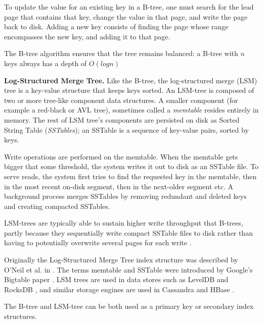 To update the value for an existing key in a B-tree, one must search for the lead page that contains that key,
change the value in that page, and write the page back to disk.
Adding a new key consists of finding the page whose range encompasses the new key, and adding it to that page.

The B-tree algorithm ensures that the tree remains balanced: a B-tree with $n$ keys always has a depth of $O(log n)$

\medskip
\noindent
\textbf{Log-Structured Merge Tree.}
Like the B-tree, the log-structured merge (LSM) tree is a key-value structure that keeps keys sorted.
An LSM-tree is composed of two or more tree-like component data structures.
A smaller component (for example a red-black or AVL tree), sometimes called a \textit{memtable} resides entirely in
memory.
The rest of LSM tree's components are persisted on disk as Sorted String Table (\textit{SSTables}); an SSTable is a
sequence of key-value pairs, sorted by keys.

Write operations are performed on the memtable.
When the memtable gets bigger that some threshold, the system writes it out to disk as an SSTable file.
To serve reads, the system first tries to find the requested key in the memtable, then in the most recent on-disk segment,
then in the next-older segment etc.
A background process merges SSTables by removing redundant and deleted keys and creating compacted SSTables.

LSM-trees are typically able to sustain higher write throughput that B-trees, partly because they sequentially write
compact SSTable files to disk rather than having to potentially overwrite several pages for each write \cite{lsm:vsbtree}.

Originally the Log-Structured Merge Tree index structure was described by O'Neil et al. in \cite{oneil:lsmtree}.
The terms memtable and SSTable were introduced by Google's Bigtable paper \cite{chang:bigtable}.
LSM trees are used in data stores such as LevelDB \cite{leveldb:implnotes} and RocksDB \cite{rocksdb:history},
and similar storage engines are used in Cassandra and HBase \cite{hbase:hfile}.

\bigskip
\noindent
The B-tree and LSM-tree can be both used as a primary key or secondary index structures.

